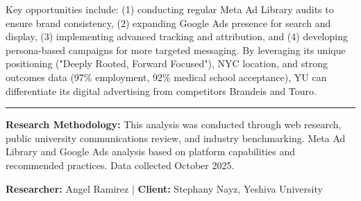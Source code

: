 \documentclass[12pt,letterpaper]{article}
\begin{document}
Key opportunities include: (1) conducting regular Meta Ad Library audits to ensure brand consistency, (2) expanding Google Ads presence for search and display, (3) implementing advanced tracking and attribution, and (4) developing persona-based campaigns for more targeted messaging. By leveraging its unique positioning ("Deeply Rooted, Forward Focused"), NYC location, and strong outcomes data (97\% employment, 92\% medical school acceptance), YU can differentiate its digital advertising from competitors Brandeis and Touro.

\vspace{0.5cm}

\noindent\rule{\textwidth}{0.4pt}

\textbf{Research Methodology:} This analysis was conducted through web research, public university communications review, and industry benchmarking. Meta Ad Library and Google Ads analysis based on platform capabilities and recommended practices. Data collected October 2025.

\textbf{Researcher:} Angel Ramirez | \textbf{Client:} Stephany Nayz, Yeshiva University
\end{document}
